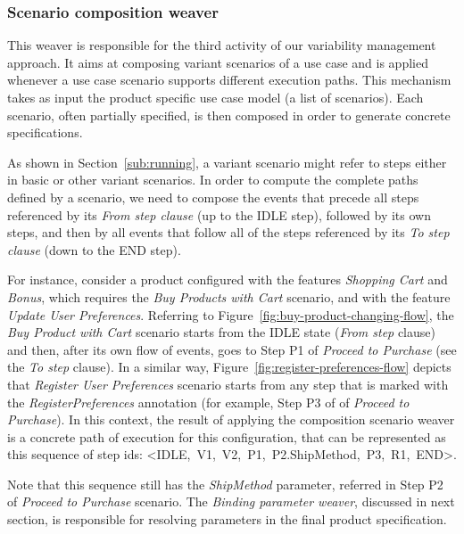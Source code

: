 
\subsubsection{Scenario composition weaver}\label{sub:sc-weaver}

This weaver is responsible for the third activity of our variability management
approach. It aims at composing variant scenarios of a use case and is applied whenever a use case scenario supports different execution paths.
This mechanism takes as input the product specific use case model (a list of scenarios). Each scenario, often partially specified, is then composed in order to generate concrete specifications.

As shown in Section~\ref{sub:running}, a variant scenario
might refer to steps either in basic or other variant scenarios. In order
to compute the complete paths defined by a scenario, we need to compose the events that precede all steps referenced by its \emph{From step
clause} (up to the IDLE step), followed by its own steps, and then by all
events that follow all of the steps referenced by its \emph{To step clause} (down to the END step).

For instance, consider a product configured with the features \emph{Shopping Cart} and \emph{Bonus}, which requires the \emph{Buy Products with Cart} scenario, and with the feature \emph{Update User Preferences}. Referring to Figure~\ref{fig:buy-product-changing-flow}, the  \emph{Buy Product with Cart} scenario starts from the IDLE state (\emph{From step} clause) and then, after its own flow of events, goes to Step P1 of \emph{Proceed to Purchase} (see the \emph{To step} clause). In a similar way, Figure~\ref{fig:register-preferences-flow} depicts that \emph{Register User Preferences} scenario starts from any step that is marked with the \emph{RegisterPreferences} annotation (for example, Step P3 of of \emph{Proceed to Purchase}). In this context, the result of applying the composition scenario weaver is a concrete path of execution for this configuration, that can be represented as this sequence of step ids: \mbox{<IDLE, V1, V2, P1, P2.ShipMethod, P3, R1, END>}.

Note that this sequence still has  the \emph{ShipMethod} parameter,
referred in Step P2 of \emph{Proceed to Purchase} scenario. The \emph{Binding parameter weaver}, discussed in next section, is responsible for resolving parameters in the final
product specification.

